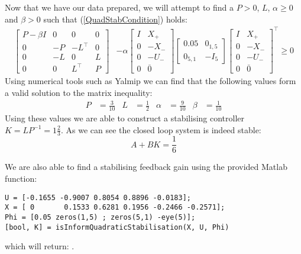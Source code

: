 Now that we have our data prepared, we will attempt to find a $P > 0$, $L$, $\alpha \geq 0$ and $\beta > 0$ such that (\ref{QuadStabCondition}) holds:
\begin{align*}
	\begin{bmatrix}
		P-\beta I&0&0&0\\0&-P&-L^\top&0\\0&-L&0&L\\0&0&L^\top&P
	\end{bmatrix} &- \alpha 
	\begin{bmatrix} I&X_+ \\ 0 & -X_- \\ 0&-U_-\\0&\overline{0} \end{bmatrix}
	\begin{bmatrix} 0.05 & 0_{1,5} \\ 0_{5,1} & -I_5 \end{bmatrix}
	\begin{bmatrix} I&X_+ \\ 0 & -X_- \\ 0&-U_-\\0&\overline{0} \end{bmatrix}^\top \geq 0 
\end{align*}
Using numerical tools such as Yalmip we can find that the following values form a valid solution to the matrix inequality:
\begin{align*}
	P &= \frac{3}{10} & L &= \frac{1}{2} & \alpha &= \frac{9}{10} & \beta &= \frac{1}{10}
\end{align*}
Using these values we are able to construct a stabilising controller $K = LP^{-1} = 1\frac{2}{3}$. As we can see the closed loop system is indeed stable:
\begin{equation*}
	A + BK = \frac{1}{6}
\end{equation*}

We are also able to find a stabilising feedback gain using the provided Matlab function:
\begin{lstlisting}
U = [-0.1655 -0.9007 0.8054 0.8896 -0.0183];
X = [ 0       0.1533 0.6281 0.1956 -0.2466 -0.2571];
Phi = [0.05 zeros(1,5) ; zeros(5,1) -eye(5)];
[bool, K] = isInformQuadraticStabilisation(X, U, Phi)
\end{lstlisting}
which will return: \mon{[ 1, 1.6977 ]}.
























